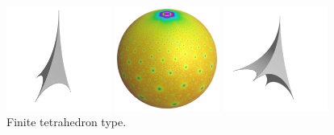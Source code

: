 \begin{figure}[H]
 \begin{minipage}{0.5\textwidth}
  \begin{minipage}[t]{0.24\textwidth}
   \centering
   \includegraphics[width=1.35in, height=1.35in, keepaspectratio]{./img/application/sphairahedron/variations/tetrahedron/sphairahedron.pdf}
  \end{minipage}
  \hspace*{\fill}
  \begin{minipage}[t]{0.24\textwidth}
   \centering
   \includegraphics[width=1.35in, height=1.35in, keepaspectratio]{./img/application/sphairahedron/variations/tetrahedron/limitset2.png}
  \end{minipage}
  \hspace*{\fill}
  \caption{Finite tetrahedron type.}
  \label{fig:tetrahedron}
 \end{minipage}
 \hspace*{\fill}
 \begin{minipage}{0.5\textwidth}
  \begin{minipage}[t]{0.24\textwidth}
   \centering
   \includegraphics[width=1.35in, height=1.35in, keepaspectratio]{./img/application/sphairahedron/variations/pentahedralPyramid/sphairahedron.pdf}
  \end{minipage}
  \hspace*{\fill}

\end{minipage}
\end{figure}
